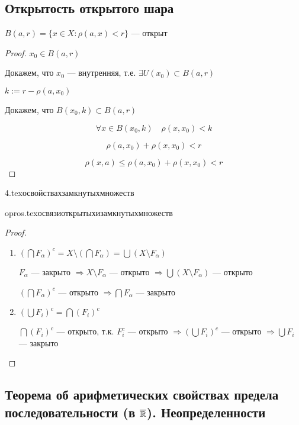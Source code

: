 \subsection{Открытость открытого шара}
$B(a,r)=\{x\in X : \rho(a,x)<r\}$ --- открыт
\begin{proof}
    $x_0\in B(a, r)$

    Докажем, что $x_0$ --- внутренняя, т.е. $\exists U(x_0)\subset B(a, r)$

    $k:=r-\rho(a, x_0)$

    Докажем, что $B(x_0, k)\subset B(a, r)$

    $$\forall x\in B(x_0, k) \quad \rho(x, x_0)<k$$
    
    $$\rho(a, x_0) + \rho(x, x_0)<r$$

    $$\rho(x, a) \leq \rho(a, x_0) + \rho(x, x_0)<r$$
\end{proof}

{4.tex}{освойствахзамкнутыхмножеств}

{opros.tex}{освязиоткрытыхизамкнутыхмножеств}
\begin{proof}
    \begin{enumerate}
        \item $(\bigcap F_\alpha)^c=X\setminus(\bigcap F_\alpha)=\bigcup (X\setminus F_\alpha)$
        
        $F_\alpha$ --- закрыто $\Rightarrow X\setminus F_\alpha$ --- открыто $\Rightarrow \bigcup (X\setminus F_\alpha)$ --- открыто

        $(\bigcap F_\alpha)^c$ --- открыто $\Rightarrow \bigcap F_\alpha$ --- закрыто

        \item $(\bigcup F_i)^c=\bigcap(F_i)^c$
        
        $\bigcap(F_i)^c$ --- открыто, т.к. $F_i^c$ --- открыто $\Rightarrow (\bigcup F_i)^c$ --- открыто $\Rightarrow \bigcup F_i$ --- закрыто
    \end{enumerate}
\end{proof}

\subsection{Теорема об арифметических свойствах предела последовательности (в $\overline{\operatorname*{\mathbb{R}}}$). Неопределенности}
